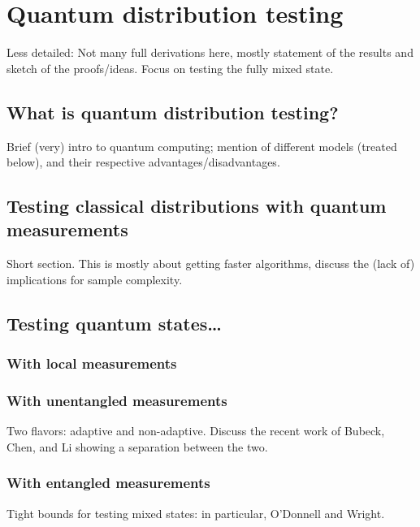 \documentclass[biber]{nowfnt} %
\begin{document}
\chapter{Quantum distribution testing}

Less detailed: Not many full derivations here, mostly statement of the results and
sketch of the proofs/ideas. Focus on testing the fully mixed state.
\section{What is quantum distribution testing?}
Brief (very) intro to quantum computing; mention of different models
(treated below), and their respective advantages/disadvantages.
\section{Testing classical distributions with quantum measurements}
Short section. This is mostly about getting faster algorithms, discuss
the (lack of) implications for sample complexity.
\section{Testing quantum states\dots}
\subsection{With local measurements}
\subsection{With unentangled measurements}
Two flavors: adaptive and non-adaptive. Discuss the recent work of
Bubeck, Chen, and Li showing a separation between the two.
\subsection{With entangled measurements}
Tight bounds for testing mixed states: in particular, O’Donnell and
Wright.

\appendix

\backmatter  %

\printbibliography
\end{document}

